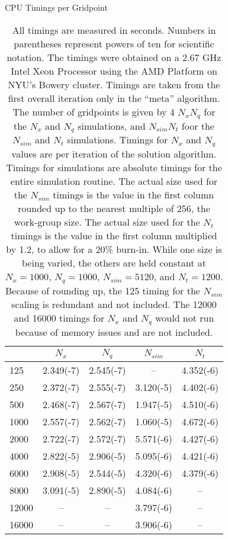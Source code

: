 \documentclass[a4paper,12pt]{article}
\numberwithin{equation}{section}
\theoremstyle{definition}
\begin{document}
\begin{table}[ht]
  \centering
  \caption{CPU Timings per Gridpoint}
  \label{tab:cpu_timings_pergrid}
  \begin{tabular}{l c c c c}
    \toprule
    & $N_x$ & $N_q$ & $N_{sim}$ & $N_t$ \\
    \midrule
    125 & 2.349(-7) & 2.545(-7) &  -- & 4.352(-6) \\
    250 & 2.372(-7) & 2.555(-7) & 3.120(-5) & 4.402(-6) \\
    500 & 2.468(-7) & 2.567(-7) & 1.947(-5) & 4.510(-6) \\
    1000 & 2.557(-7) & 2.562(-7) & 1.060(-5) & 4.672(-6) \\
    2000 & 2.722(-7) & 2.572(-7) & 5.571(-6) & 4.427(-6) \\
    4000 & 2.822(-5) & 2.906(-5) & 5.095(-6) & 4.421(-6) \\
    6000 & 2.908(-5) & 2.544(-5) & 4.320(-6) & 4.379(-6) \\
    8000 & 3.091(-5) & 2.890(-5) & 4.084(-6) &  -- \\
    12000 &  -- &  -- & 3.797(-6) &  -- \\
    16000 &  -- &  -- & 3.906(-6) &  -- \\
    \bottomrule
  \end{tabular}
  \caption*{\footnotesize All timings are measured in seconds. Numbers in parentheses represent powers of ten for scientific notation. The timings were obtained on a 2.67 GHz Intel Xeon Processor using the AMD Platform on NYU's Bowery cluster. Timings are taken from the first overall iteration only in the ``meta'' algorithm. The number of gridpoints is given by 4 $N_x N_q$ for the $N_x$ and $N_q$ simulations, and $N_{sim} N_t$ foor the $N_{sim}$ and $N_t$ simulations. Timings for $N_x$ and $N_q$ values are per iteration of the solution algorithm. Timings for simulations are absolute timings for the entire simulation routine. The actual size used for the $N_{sim}$ timings is the value in the first column rounded up to the nearest multiple of 256, the work-group size. The actual size used for the $N_t$ timings is the value in the first column multiplied by 1.2, to allow for a 20\% burn-in. While one size is being varied, the others are held constant at $N_x = 1000$, $N_q = 1000$, $N_{sim} = 5120$, and $N_t = 1200$. Because of rounding up, the 125 timing for the $N_{sim}$ scaling is redundant and not included. The 12000 and 16000 timings for $N_x$ and $N_q$ would not run because of memory issues and are not included.}
\end{table}
\end{document}
